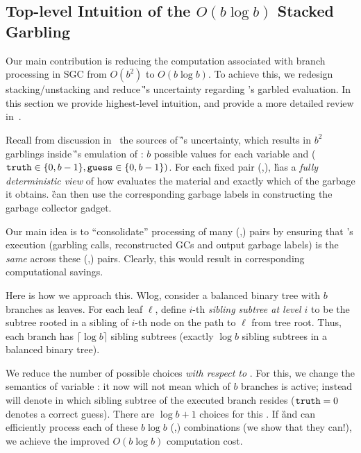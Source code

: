 
\subsection{Top-level Intuition of the $O(b \log b)$ Stacked Garbling}
\label{sec:intuition}

Our main contribution is reducing the computation associated with branch processing in SGC from $O(b^2)$ to $O(b \log b)$.
To achieve this, we redesign stacking/unstacking and reduce \G's uncertainty regarding \E's garbled evaluation.  
In this section we provide highest-level intuition, and provide a more detailed review in~.
 
   Recall from discussion in~ the  sources of \G's uncertainty, which results in $b^2$ garblings inside \G's emulation of \E: $b$ possible values for each variable \truth and \guess ($\mathtt{truth} \in\{0,b-1\}, \mathtt{guess}\in\{0,b-1\})$.
   For each fixed pair  (\truth,\guess), \G has a {\em fully deterministic view} of how \E evaluates the material and exactly which of the garbage it obtains.  \G can then use the corresponding garbage labels in constructing the garbage collector gadget.
   
   Our main idea  is to ``consolidate''  processing of many (\truth,\guess) pairs by ensuring that \E's execution (garbling calls, reconstructed GCs and output garbage labels) is the {\em same} across these (\truth,\guess) pairs.  Clearly, this would result in corresponding computational savings. 
   

  
  Here is how we approach this.  Wlog, consider a balanced binary tree with $b$ branches as leaves. 
  For each leaf $\ell$, define $i$-th {\em sibling subtree at level $i$} to be the subtree rooted in a sibling of $i$-th node on the path to $\ell$ from tree root.  Thus, each branch has $\lceil \log b \rceil$ sibling subtrees (exactly $\log b$ sibling subtrees in a balanced binary tree).
  
    
 We reduce the number of possible \truth choices  {\em with respect to  \guess}.  For this, we  change the semantics of variable \truth: it now will not mean which of $b$ branches is active; instead \truth will denote in which sibling subtree of \guess the executed branch resides ($\mathtt{truth}=0$ denotes a correct guess).  There are $\log b + 1$ choices for this \truth.  If \G and \E can efficiently process each of these $b\log b$  (\truth,\guess) combinations  (we show that they can!), we achieve the improved $O(b\log b)$ computation cost.
  
  
  
 

